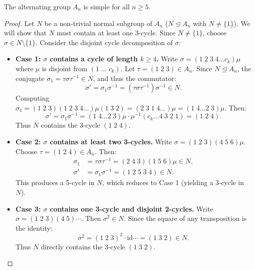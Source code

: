 \begin{theorem}
\label{thm:simplicity_an}
The alternating group $A_n$ is simple for all $n \ge 5$.
\end{theorem}

\begin{proof}
Let $N$ be a non-trivial normal subgroup of $A_n$ ($N \trianglelefteq A_n$ with $N \ne \{1\}$).
We will show that $N$ must contain at least one 3-cycle.
Since $N \ne \{1\}$, choose $\sigma \in N \setminus \{1\}$.
Consider the disjoint cycle decomposition of $\sigma$:
\begin{itemize}[leftmargin=1.5em, itemsep=6pt]
    \item \textbf{Case 1: $\sigma$ contains a cycle of length $k \ge 4$.}
    Write $\sigma = (1 \; 2 \; 3 \; 4 \dots c_k)\mu$ where $\mu$ is disjoint from $(1 \; \dots \; c_k)$.
    Let $\tau = (1 \; 2 \; 3) \in A_n$.
    Since $N \trianglelefteq A_n$, the conjugate $\sigma_1 = \tau \sigma \tau^{-1} \in N$, and thus the commutator:
    \begin{equation*}
    \sigma' = \sigma_1 \sigma^{-1} = (\tau \sigma \tau^{-1})\sigma^{-1} \in N.
    \end{equation*}
    Computing $\sigma_1 = (1 \; 2 \; 3)(1 \; 2 \; 3 \; 4 \dots)\mu(1 \; 3 \; 2) = (2 \; 3 \; 1 \; 4 \dots)\mu = (1 \; 4 \dots 2 \; 3)\mu$.
    Then:
    \begin{equation*}
    \sigma' = \sigma_1 \sigma^{-1} = (1 \; 4 \dots 2 \; 3)\mu \cdot \mu^{-1}(c_k \dots 4 \; 3 \; 2 \; 1) = (1 \; 2 \; 4).
    \end{equation*}
    Thus $N$ contains the 3-cycle $(1 \; 2 \; 4)$.

    \item \textbf{Case 2: $\sigma$ contains at least two 3-cycles.}
    Write $\sigma = (1 \; 2 \; 3)(4 \; 5 \; 6)\mu$.
    Choose $\tau = (1 \; 2 \; 4) \in A_n$.
    Then:
    \begin{align*}
    \sigma_1 &= \tau \sigma \tau^{-1} = (2 \; 4 \; 3)(1 \; 5 \; 6)\mu \in N, \\
    \sigma' &= \sigma_1 \sigma^{-1} = (1 \; 2 \; 5 \; 3 \; 4) \in N.
    \end{align*}
    This produces a 5-cycle in $N$, which reduces to Case 1 (yielding a 3-cycle in $N$).

    \item \textbf{Case 3: $\sigma$ contains one 3-cycle and disjoint 2-cycles.}
    Write $\sigma = (1 \; 2 \; 3)(4 \; 5)\cdots$.
    Then $\sigma^2 \in N$.
    Since the square of any transposition is the identity:
    \begin{equation*}
    \sigma^2 = (1 \; 2 \; 3)^2 \cdot \text{id} \cdots = (1 \; 3 \; 2) \in N.
    \end{equation*}
    Thus $N$ directly contains the 3-cycle $(1 \; 3 \; 2)$.


\end{itemize}
\end{proof}
